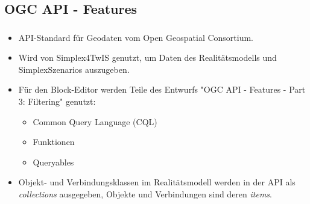 \subsection{OGC API - Features}
\begin{frame}
  \frametitle{\currentsectionname}

  \begin{itemize}
    \item API-Standard für Geodaten vom Open Geospatial Consortium.
    \item Wird von Simplex4TwIS genutzt, um Daten des Realitätsmodells und SimplexSzenarios auszugeben.
    \item Für den Block-Editor werden Teile des Entwurfs "OGC API - Features - Part 3: Filtering" genutzt:
          \begin{itemize}
            \item Common Query Language (CQL)
            \item Funktionen
            \item Queryables
          \end{itemize}
    \item Objekt- und Verbindungsklassen im Realitätsmodell werden in der API als \textit{collections} ausgegeben, Objekte und Verbindungen sind deren \textit{items}.
  \end{itemize}


\end{frame}

